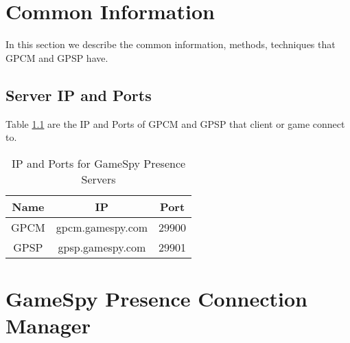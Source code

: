 \documentclass[oneside,titlepage,a4paper]{Definition/retrospy} %
\begin{document}
\chapter{Common Information}
In this section we describe the common information, methods, techniques that GPCM and GPSP have.
\section{Server IP and Ports}
Table \ref{IP and Ports for GameSpy Presence Servers} are the  IP and Ports of GPCM and GPSP that client or game connect to.
\begin{table}[H]
	\centering
	\begin{tabular}{|c|c|c|}
		\hline 
		\textbf{Name}&\textbf{IP}&\textbf{Port}\\ 
		\hline 
		GPCM&gpcm.gamespy.com&29900 \\ 
	 	\hline 
		GPSP&gpsp.gamespy.com&29901 \\
		\hline
	\end{tabular} 
\caption{IP and Ports for GameSpy Presence Servers}
\label{IP and Ports for GameSpy Presence Servers}

\end{table}

\chapter{GameSpy Presence Connection Manager}
\end{document}
